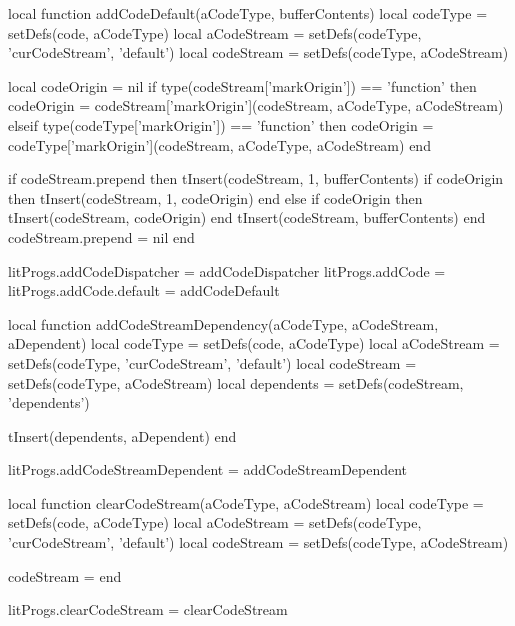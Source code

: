 local function addCodeDefault(aCodeType, bufferContents)
  local codeType        = setDefs(code, aCodeType)
  local aCodeStream     = setDefs(codeType, 'curCodeStream', 'default')
  local codeStream      = setDefs(codeType, aCodeStream)

  local codeOrigin      = nil
    if type(codeStream['markOrigin']) == 'function' then
      codeOrigin =
        codeStream['markOrigin'](codeStream, aCodeType, aCodeStream)
    elseif type(codeType['markOrigin']) == 'function' then
      codeOrigin =
        codeType['markOrigin'](codeStream, aCodeType, aCodeStream)
    end

  if codeStream.prepend then
    tInsert(codeStream, 1, bufferContents)
    if codeOrigin then 
      tInsert(codeStream, 1, codeOrigin)
    end
  else
    if codeOrigin then
      tInsert(codeStream, codeOrigin)
    end
    tInsert(codeStream, bufferContents)
  end
  codeStream.prepend = nil
end

litProgs.addCodeDispatcher = addCodeDispatcher
litProgs.addCode           = {}
litProgs.addCode.default   = addCodeDefault

local function addCodeStreamDependency(aCodeType, aCodeStream, aDependent)
  local codeType        = setDefs(code, aCodeType)
  local aCodeStream     = setDefs(codeType, 'curCodeStream', 'default')
  local codeStream      = setDefs(codeType, aCodeStream)
  local dependents      = setDefs(codeStream, 'dependents')
  
  tInsert(dependents, aDependent)
end

litProgs.addCodeStreamDependent = addCodeStreamDependent

local function clearCodeStream(aCodeType, aCodeStream)
  local codeType        = setDefs(code, aCodeType)
  local aCodeStream     = setDefs(codeType, 'curCodeStream', 'default')
  local codeStream      = setDefs(codeType, aCodeStream)

  codeStream = { }
end

litProgs.clearCodeStream = clearCodeStream

